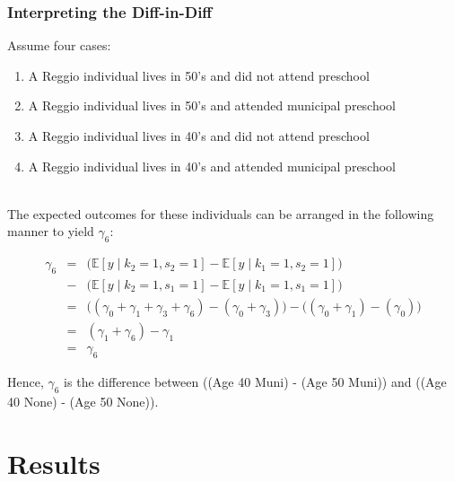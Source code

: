 \documentclass{beamer}
\begin{document}
\begin{frame} \frametitle{Interpreting the Diff-in-Diff}
\begin{footnotesize}
Assume four cases: 
\begin{enumerate}
\item A Reggio individual lives in 50's and did not attend preschool
\item A Reggio individual lives in 50's and attended municipal preschool
\item A Reggio individual lives in 40's and did not attend preschool
\item A Reggio individual lives in 40's and attended municipal preschool \\\
\end{enumerate}

The expected outcomes for these individuals can be arranged in the following manner to yield $\gamma_6$:

\begin{eqnarray*}
\gamma_6 & = & \Big(\mathbb{E}[y \mid k_2 = 1, s_2 = 1] - \mathbb{E}[y \mid k_1 = 1, s_2 = 1] \Big) \\
& - & \Big(\mathbb{E}[y \mid k_2 = 1, s_1 = 1] - \mathbb{E}[y \mid k_1 = 1, s_1 = 1] \Big) \\
& = & \Big((\gamma_0 + \gamma_1 + \gamma_3 + \gamma_6) - (\gamma_0 + \gamma_3)\Big) - \Big((\gamma_0 + \gamma_1) - (\gamma_0) \Big) \\
& = & (\gamma_1 + \gamma_6) - \gamma_1 \\
& = & \gamma_6
\end{eqnarray*}

Hence, $\gamma_6$ is the difference between \Big((Age 40 Muni) - (Age 50 Muni)\Big) and \Big((Age 40 None) - (Age 50 None)\Big).
\end{footnotesize}
\end{frame}

\section{Results}\label{sec:Results}
\end{document}
